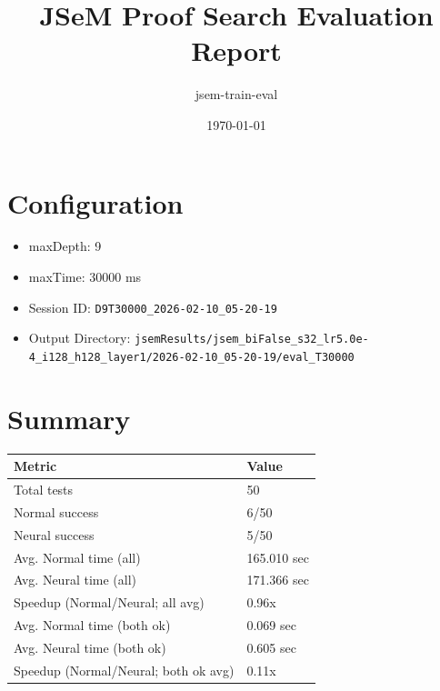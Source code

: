\documentclass[a4paper,10pt]{article}
\title{JSeM Proof Search Evaluation Report}
\author{jsem-train-eval}
\date{\today}
\begin{document}
\maketitle

\section{Configuration}
\begin{itemize}
\item maxDepth: 9
\item maxTime: 30000 ms
\item Session ID: \texttt{D9T30000\_2026-02-10\_05-20-19}
\item Output Directory: \texttt{jsemResults/jsem\_biFalse\_s32\_lr5.0e-4\_i128\_h128\_layer1/2026-02-10\_05-20-19/eval\_T30000}
\end{itemize}

\section{Summary}
\begin{tabular}{ll}
\toprule
\textbf{Metric} & \textbf{Value} \\
\midrule
Total tests & 50 \\
Normal success & 6/50 \\
Neural success & 5/50 \\
\midrule
Avg. Normal time (all) & 165.010 sec \\
Avg. Neural time (all) & 171.366 sec \\
Speedup (Normal/Neural; all avg) & 0.96x \\
Avg. Normal time (both ok) & 0.069 sec \\
Avg. Neural time (both ok) & 0.605 sec \\
Speedup (Normal/Neural; both ok avg) & 0.11x \\
\bottomrule
\end{tabular}
\end{document}
